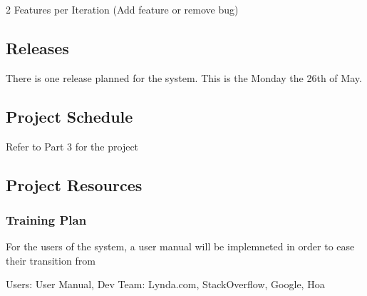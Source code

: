 2 Features per Iteration (Add feature or remove bug)



\subsection{Releases}

There is one release planned for the system. This is the Monday the 26th of May.


\subsection{Project Schedule}

Refer to Part 3 for the project 


\subsection{Project Resources}



\subsubsection{Training Plan}

For the users of the system, a user manual will be implemneted in order to ease their transition from

	Users: User Manual, Dev Team: Lynda.com, StackOverflow, Google, Hoa


